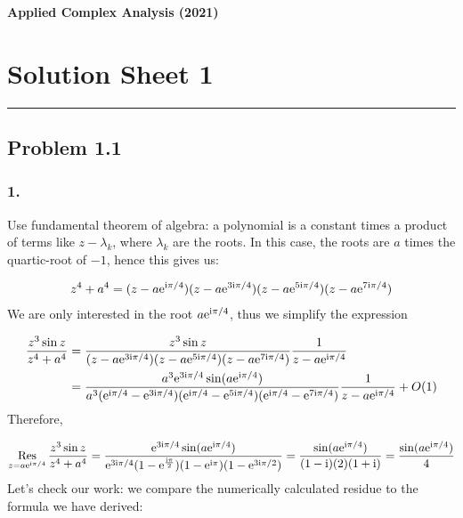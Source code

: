 \documentclass[12pt,a4paper]{article}
\def\I{ {\rm i} }
\def\E{ {\rm e} }
\def\Res_#1{\underset{#1}{\rm Res}\,}
\begin{document}
\textbf{Applied Complex Analysis (2021)}

\section{Solution Sheet 1}
\rule{\textwidth}{1pt}
\subsection{Problem 1.1}
\subsubsection{1.}
Use fundamental theorem of algebra: a polynomial is a constant times a product of terms like $z - \lambda_k$, where $\lambda_k$ are the roots. In this case, the roots are $a$ times the quartic-root of $-1$, hence  this gives us:


\begin{align*}
z^4 + a^4 = (z-a \E^{\I \pi /4})(z-a \E^{3\I \pi /4})(z-a \E^{5\I \pi /4})(z-a \E^{7\I \pi /4})
\end{align*}
We are only interested in the root $a \E^{\I \pi /4}$, thus we simplify the expression


\begin{align*}
{z^3 \sin z \over z^4 + a^4} &= {z^3 \sin z \over (z-a \E^{3\I \pi /4})(z-a \E^{5\I \pi /4})(z-a \E^{7\I \pi /4})} {1 \over z-a \E^{\I \pi /4}} \\
  &= {a^3\E^{3\I \pi /4} \sin(a \E^{\I \pi /4}) \over a^3 (\E^{\I \pi / 4} - \E^{3\I \pi /4})(\E^{\I \pi / 4} - \E^{5\I \pi /4})(\E^{\I \pi / 4} - \E^{7\I \pi /4})} {1 \over z-a \E^{\I \pi /4}} + O(1)
\end{align*}
Therefore,

\[
\Res_{z = a \E^{\I \pi /4}} {z^3 \sin z \over z^4 + a^4} = { \E^{3\I \pi /4} \sin(a \E^{\I \pi /4}) \over \E^{3\I \pi /4} (1 - \E^{\I \pi \over 2})(1 - \E^{\I \pi })(1 - \E^{3\I \pi/2 })}= { \sin(a \E^{\I \pi /4}) \over (1 - \I) (2) (1+ \I)}= { \sin(a \E^{\I \pi /4}) \over 4}
\]
Let's check our work: we compare the numerically calculated residue to the formula we have derived:
\end{document}
